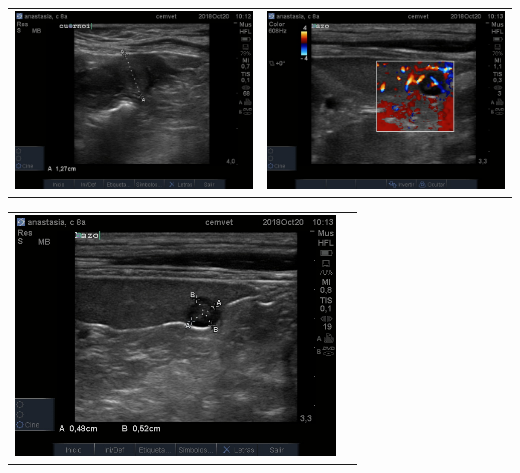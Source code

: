 \documentclass{article}
\begin{document}
\noindent\begin{tabularx}{\textwidth}{XR}
  \includegraphics[width=8.5cm,trim={85px 45px 45px 25px},clip]{./example/101221hs[0048132].jpg} & \includegraphics[width=8.5cm,trim={85px 45px 45px 25px},clip]{./example/101313hs[0048135].jpg} \\
\end{tabularx}

\noindent\begin{tabularx}{\textwidth}{XR}
  \includegraphics[width=8.5cm,trim={85px 45px 45px 25px},clip]{./example/101304hs[0048134].jpg} &  \\
\end{tabularx}

\renewcommand{\arraystretch}{1}
\end{document}
